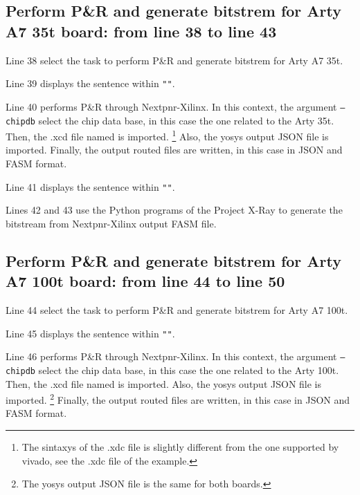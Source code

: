 \subsection{Perform P\&R and generate bitstrem for Arty A7 35t board: from line 38 to line 43}

Line 38 select the task to perform P\&R and generate bitstrem for Arty A7 35t.

\vspace{5mm} 

\noindent Line 39 displays the sentence within \texttt{""}.

\vspace{5mm} 

\noindent Line 40 performs P\&R through Nextpnr-Xilinx. 
In this context, the argument \texttt{--chipdb} select the chip data base, in this case the one related to the Arty 35t.
Then, the .xcd file named  is imported. \footnote{The sintaxys of the .xdc file is slightly different from the one supported by vivado, see the .xdc file of the example.} 
Also, the yosys output JSON file is imported.
Finally, the output routed files are written, in this case in JSON and FASM format. 

\vspace{5mm} 

\noindent Line 41 displays the sentence within \texttt{""}.

\vspace{5mm} 

\noindent Lines 42 and 43 use the Python programs of the Project X-Ray to generate the bitstream from Nextpnr-Xilinx output FASM file.

\subsection{Perform P\&R and generate bitstrem for Arty A7 100t board: from line 44 to line 50}

Line 44 select the task to perform P\&R and generate bitstrem for Arty A7 100t.

\vspace{5mm} 

\noindent Line 45 displays the sentence within \texttt{""}.

\vspace{5mm} 

\noindent Line 46 performs P\&R through Nextpnr-Xilinx. 
In this context, the argument \texttt{--chipdb} select the chip data base, in this case the one related to the Arty 100t.
Then, the .xcd file named  is imported.
Also, the yosys output JSON file is imported. \footnote{The yosys output JSON file is the same for both boards.}
Finally, the output routed files are written, in this case in JSON and FASM format. 

